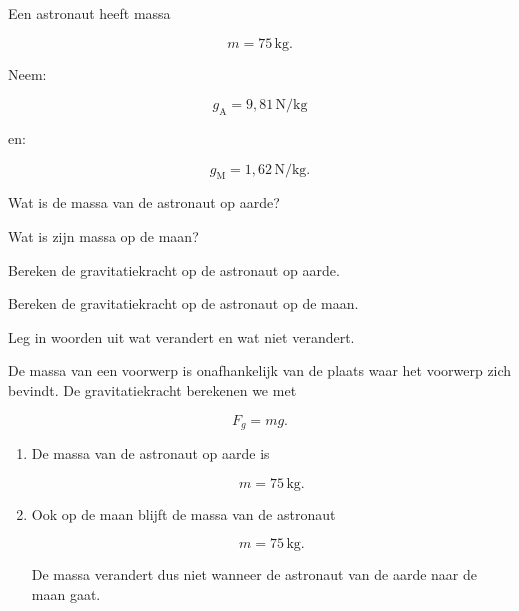 \documentclass{ximera}
\begin{document}
\begin{oefening}{\oefB\ESS}

Een astronaut heeft massa

\[
m=75\,\mathrm{kg}.
\]

Neem:

\[
g_\mathrm A=9{,}81\,\mathrm{N/kg}
\]

en:

\[
g_\mathrm M=1{,}62\,\mathrm{N/kg}.
\]

\begin{question}
Wat is de massa van de astronaut op aarde?
\end{question}

\begin{question}
Wat is zijn massa op de maan?
\end{question}

\begin{question}
Bereken de gravitatiekracht op de astronaut op aarde.
\end{question}

\begin{question}
Bereken de gravitatiekracht op de astronaut op de maan.
\end{question}

\begin{question}
Leg in woorden uit wat verandert en wat niet verandert.
\end{question}

\begin{oplossing}

      De massa van een voorwerp is onafhankelijk van de plaats waar het
      voorwerp zich bevindt. De gravitatiekracht berekenen we met
      
      \[
      \boxed{
      F_g=mg.
      }
      \]
      
      \begin{enumerate}
      
      \item
      De massa van de astronaut op aarde is
      
      \[
      \boxed{
      m=75\,\mathrm{kg}.
      }
      \]
      
      \item
      Ook op de maan blijft de massa van de astronaut
      
      \[
      \boxed{
      m=75\,\mathrm{kg}.
      }
      \]
      
      De massa verandert dus niet wanneer de astronaut van de aarde naar
      de maan gaat.
      

\end{enumerate}
\end{oplossing}
\end{oefening}
\end{document}

